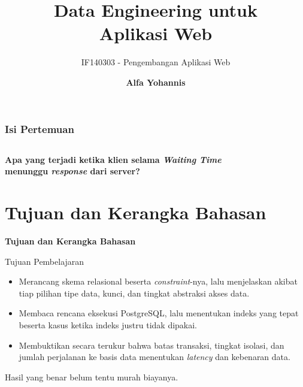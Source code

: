 \documentclass[aspectratio=169, table, 12pt]{beamer}
\title{\Huge Data Engineering untuk\\ \vspace{10pt} Aplikasi Web}
\subtitle{IF140303 - Pengembangan Aplikasi Web}
\author{\textbf{Alfa Yohannis}}
\begin{document}
\frame{\titlepage}

\begin{frame}[fragile]
  \frametitle{Isi Pertemuan}
  \vspace{20pt}
  \begin{columns}[t]
    \tableofcontents[sections={1-5}]

    \tableofcontents[sections={6-9}]
  \end{columns}
\end{frame}

\begin{frame}{\hfill}
  \centering
  \Huge{\textbf{Apa yang terjadi ketika klien selama \emph{Waiting Time}\\ menunggu \emph{response} dari server?}}
\end{frame}

\section{Tujuan dan Kerangka Bahasan}

\begin{frame}{\hfill}
  \centering
  \Huge{\textbf{Tujuan dan Kerangka Bahasan}}
\end{frame}

\begin{frame}{{\Large Tujuan Pembelajaran}}
  \vspace{15pt}
  \begin{itemize}
    \item Merancang skema relasional beserta \textit{constraint}-nya, lalu menjelaskan
          akibat tiap pilihan tipe data, kunci, dan tingkat abstraksi akses
          data.
    \item Membaca rencana eksekusi PostgreSQL, lalu menentukan indeks yang
          tepat beserta kasus ketika indeks justru tidak dipakai.
    \item Membuktikan secara terukur bahwa batas transaksi, tingkat isolasi,
          dan jumlah perjalanan ke basis data menentukan \textit{latency} dan
          kebenaran data.
  \end{itemize}
  \vspace{10pt}
  {\footnotesize Hasil yang benar belum tentu murah biayanya.}
\end{frame}
\end{document}
